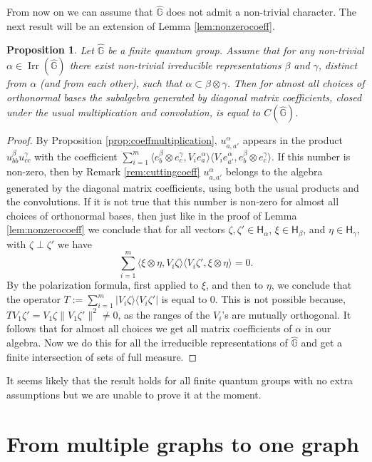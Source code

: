 \documentclass[12pt]{amsart}
\newcommand{\op}[1]{\operatorname{#1}}
\newtheorem{prop}[thm]{Proposition}
\theoremstyle{definition}
\theoremstyle{definition}
\theoremstyle{definition}
\theoremstyle{definition}
\newcommand{\G}{\mathbb{G}}
\numberwithin{equation}{section}
\begin{document}
From now on we can assume that $\widehat{\G}$ does not admit a non-trivial character. The next result will be an extension of Lemma \ref{lem:nonzerocoeff}.
\begin{prop}
Let $\widehat{\G}$ be a finite quantum group. Assume that for any non-trivial $\alpha \in \op{Irr}(\widehat{\G})$ there exist non-trivial irreducible representations $\beta$ and $\gamma$, distinct from $\alpha$ (and from each other), such that $\alpha \subset \beta\otimes \gamma$. Then for almost all choices of orthonormal bases the subalgebra generated by diagonal matrix coefficients, closed under the usual multiplication and convolution, is equal to $C(\widehat{\G})$.
\end{prop}
\begin{proof}
By Proposition \ref{prop:coeffmultiplication}, $u_{a,a'}^{\alpha}$ appears in the product $u_{bb}^{\beta} u_{cc}^{\gamma}$ with the coefficient $\sum_{i=1}^{m} \langle e_{b}^{\beta}\otimes e_{c}^{\gamma}, V_i e_{a}^{\alpha}\rangle\langle V_i e_{a'}^{\alpha}, e_{b}^{\beta}\otimes e_{c}^{\gamma}\rangle$. If this number is non-zero, then by Remark \ref{rem:cuttingcoeff} $u_{a,a'}^{\alpha}$ belongs to the algebra generated by the diagonal matrix coefficients, using both the usual products and the convolutions. If it is not true that this number is non-zero for almost all choices of orthonormal bases, then  just like in the proof of Lemma \ref{lem:nonzerocoeff} we conclude that for all vectors $\zeta, \zeta' \in \mathsf{H}_{\alpha}$, $\xi \in \mathsf{H}_{\beta}$, and $\eta \in \mathsf{H}_{\gamma}$, with $\zeta \perp \zeta'$ we have 
\[
\sum_{i=1}^{m} \langle \xi\otimes \eta, V_i \zeta\rangle\langle V_i \zeta', \xi\otimes \eta\rangle = 0.
\]
By the polarization formula, first applied to $\xi$, and then to $\eta$, we conclude that the operator $T:=\sum_{i=1}^{m} |V_i \zeta\rangle\langle V_i \zeta'|$ is equal to $0$. This is not possible because, $T V_{1}\zeta' = V_1 \zeta \|V_1 \zeta'\|^2 \neq 0$, as the ranges of the $V_i$'s are mutually orthogonal. It follows that for almost all choices we get all matrix coefficients of $\alpha$ in our algebra. Now we do this for all the irreducible representations of $\widehat{\G}$ and get a finite intersection of sets of full measure.
\end{proof}
It seems likely that the result holds for all finite quantum groups with no extra assumptions but we are unable to prove it at the moment.

\section{From multiple graphs to one graph}
\label{sec.step2}
\end{document}

